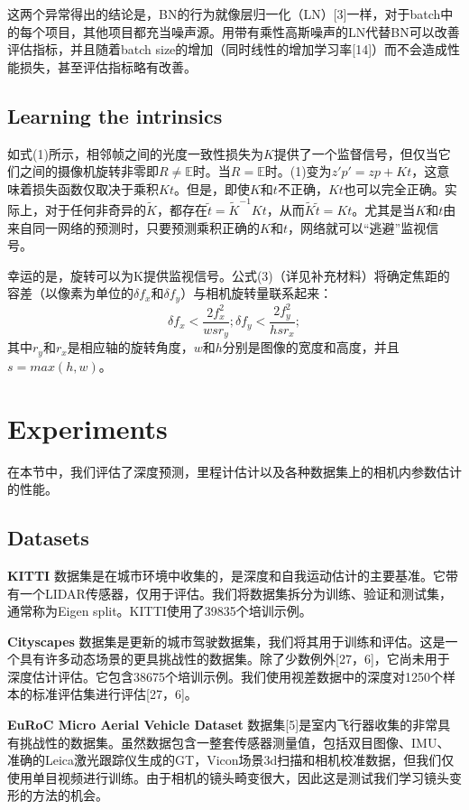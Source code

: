\documentclass[10pt,journal,compsoc,UTF8]{IEEEtran}
\begin{document}
这两个异常得出的结论是，BN的行为就像层归一化（LN）[3]一样，对于batch中的每个项目，其他项目都充当噪声源。用带有乘性高斯噪声的LN代替BN可以改善评估指标，并且随着batch size的增加（同时线性的增加学习率[14]）而不会造成性能损失，甚至评估指标略有改善。

\subsection{Learning the intrinsics}
如式(1)所示，相邻帧之间的光度一致性损失为$K$提供了一个监督信号，但仅当它们之间的摄像机旋转非零即$R\neq\mathbb{E}$时。当$R=\mathbb{E}$时。(1)变为$z'p'= zp + Kt$，这意味着损失函数仅取决于乘积$Kt$。但是，即使$K$和$t$不正确，$Kt$也可以完全正确。实际上，对于任何非奇异的$\tilde{K}$，都存在$\tilde{t} =\tilde{K}^{-1}Kt$，从而$\tilde{K}\tilde{t}= Kt$。尤其是当$K$和$t$由来自同一网络的预测时，只要预测乘积正确的$K$和$t$，网络就可以“逃避”监视信号。

幸运的是，旋转可以为K提供监视信号。公式(3)（详见补充材料）将确定焦距的容差（以像素为单位的$\delta f_x$和$\delta f_y$）与相机旋转量联系起来：
\begin{equation}
  \delta f_x < \frac{2f_x^2}{wsr_y};\delta f_y < \frac{2f_y^2}{hsr_x};
\end{equation}
其中$r_y$和$r_x$是相应轴的旋转角度，$w$和$h$分别是图像的宽度和高度，并且$s = max(h,w)$。

\section{Experiments}
在本节中，我们评估了深度预测，里程计估计以及各种数据集上的相机内参数估计的性能。
\subsection{Datasets}
\textbf{KITTI} 数据集是在城市环境中收集的，是深度和自我运动估计的主要基准。它带有一个LIDAR传感器，仅用于评估。我们将数据集拆分为训练、验证和测试集，通常称为Eigen split。KITTI使用了39835个培训示例。

\textbf{Cityscapes} 数据集是更新的城市驾驶数据集，我们将其用于训练和评估。这是一个具有许多动态场景的更具挑战性的数据集。除了少数例外[27，6]，它尚未用于深度估计评估。它包含38675个培训示例。我们使用视差数据中的深度对1250个样本的标准评估集进行评估[27，6]。

\textbf{EuRoC Micro Aerial Vehicle Dataset} 数据集[5]是室内飞行器收集的非常具有挑战性的数据集。虽然数据包含一整套传感器测量值，包括双目图像、IMU、准确的Leica激光跟踪仪生成的GT，Vicon场景3d扫描和相机校准数据，但我们仅使用单目视频进行训练。由于相机的镜头畸变很大，因此这是测试我们学习镜头变形的方法的机会。
\end{document}
